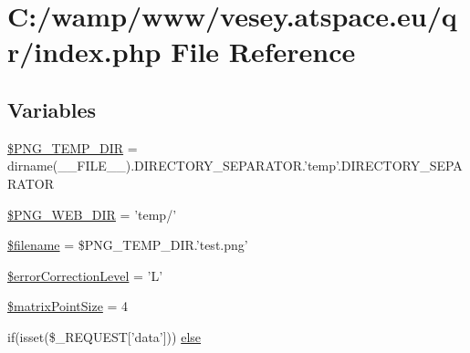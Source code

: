 \hypertarget{qr_2index_8php}{\section{C\-:/wamp/www/vesey.atspace.\-eu/qr/index.php File Reference}
\label{qr_2index_8php}
}
\subsection*{Variables}
\begin{DoxyCompactItemize}
\item 
\hyperlink{qr_2index_8php_abe1062d1fa011bf02a1d93f5e40f914c}{\$\-P\-N\-G\-\_\-\-T\-E\-M\-P\-\_\-\-D\-I\-R} = dirname(\-\_\-\-\_\-\-F\-I\-L\-E\-\_\-\-\_\-).D\-I\-R\-E\-C\-T\-O\-R\-Y\-\_\-\-S\-E\-P\-A\-R\-A\-T\-O\-R.'temp'.D\-I\-R\-E\-C\-T\-O\-R\-Y\-\_\-\-S\-E\-P\-A\-R\-A\-T\-O\-R
\item 
\hyperlink{qr_2index_8php_a21b3ffb54edc6b2f903575fe682d56ce}{\$\-P\-N\-G\-\_\-\-W\-E\-B\-\_\-\-D\-I\-R} = 'temp/'
\item 
\hyperlink{qr_2index_8php_a0722441477f957078ee2437054556cbc}{\$filename} = \$P\-N\-G\-\_\-\-T\-E\-M\-P\-\_\-\-D\-I\-R.'test.\-png'
\item 
\hyperlink{qr_2index_8php_ad8d1028172b6dc55d82ee8601d07344e}{\$error\-Correction\-Level} = 'L'
\item 
\hyperlink{qr_2index_8php_aab291c92521203a08ba053aeed689f38}{\$matrix\-Point\-Size} = 4
\item 
if(isset(\$\-\_\-\-R\-E\-Q\-U\-E\-S\-T\mbox{[}'data'\mbox{]})) \hyperlink{qr_2index_8php_a9b82d7b40f4d9cafa83df2563d167625}{else}
\end{DoxyCompactItemize}


